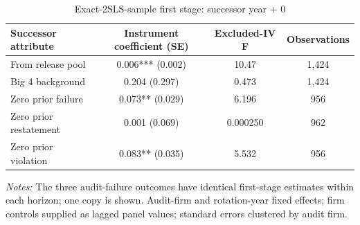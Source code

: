 \begin{table}[htbp]
\footnotesize
\centering
\caption{Exact-2SLS-sample first stage: successor year + 0}
\begin{threeparttable}
\begin{tabular}{p{}ccc}
\toprule
Successor attribute & Instrument coefficient (SE) & Excluded-IV F & Observations \\
\midrule
From release pool & 0.006*** (0.002) & 10.47 & 1,424 \\
Big 4 background & 0.204 (0.297) & 0.473 & 1,424 \\
Zero prior failure & 0.073** (0.029) & 6.196 & 956 \\
Zero prior restatement & 0.001 (0.069) & 0.000250 & 962 \\
Zero prior violation & 0.083** (0.035) & 5.532 & 956 \\
\bottomrule
\end{tabular}
\begin{tablenotes}\footnotesize
\item \raggedright \textit{Notes:} The three audit-failure outcomes have identical first-stage estimates within each horizon; one copy is shown. Audit-firm and rotation-year fixed effects; firm controls supplied as lagged panel values; standard errors clustered by audit firm.
\end{tablenotes}
\end{threeparttable}
\end{table}
